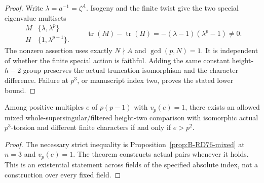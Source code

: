 \begin{proof}
Write $\lambda=a^{-1}=\zeta^A$. Isogeny and the finite
twist give the two special eigenvalue multisets
\[
 \begin{array}{c|c}
 M&\{\lambda,\lambda^p\}\\
 H&\{1,\lambda^{p+1}\}.
 \end{array}
 \qquad
 \operatorname{tr}(M)-\operatorname{tr}(H)
             =-(\lambda-1)(\lambda^p-1)\ne0 .           \tag{B-RD100.12}
\]
The nonzero assertion uses exactly $N\nmid A$ and
$\gcd(p,N)=1$. It is independent of whether the finite
special action is faithful. Adding the same constant
height-$h-2$ group preserves the actual truncation isomorphism
and the character difference. Failure at $p^3$, or manuscript
index two, proves the stated lower bound.
\end{proof}

\begin{corollary}
\label{cor:B-RD100-threshold}
Among positive multiples $e$ of $p(p-1)$ with $v_p(e)=1$,
there exists an allowed mixed whole-supersingular/filtered
height-two comparison with isomorphic actual $p^3$-torsion
and different finite characters if and only if $e>p^2$.
\end{corollary}
\begin{proof}
The necessary strict inequality is
Proposition~\ref{prop:B-RD76-mixed} at $n=3$ and $v_p(e)=1$.
The theorem constructs actual pairs whenever it holds.
This is an existential statement across fields of the
specified absolute index, not a construction over every
fixed field.
\end{proof}

